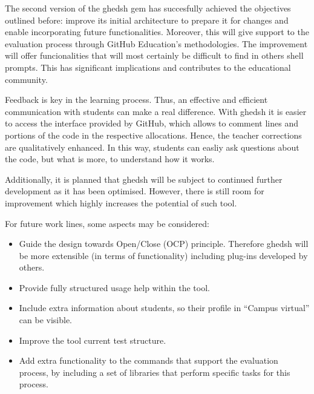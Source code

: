 
The second version of the ghedsh gem has succesfully achieved the objectives outlined
before: improve its initial architecture to prepare it for changes and enable
incorporating future functionalities. Moreover, this will give support to the evaluation
process through GitHub Education’s methodologies. The improvement will offer
funcionalities that will most certainly be difficult to find in others shell prompts.
This has significant implications and contributes to the educational community.
\bigskip

Feedback is key in the learning process. Thus, an effective and efficient communication
with students can make a real difference. With ghedsh it is easier to access the interface
provided by GitHub, which allows to comment lines and portions of the code in the
respective allocations. Hence, the teacher corrections are qualitatively enhanced. In
this way, students can easliy ask questions about the code, but what is more, to
understand how it works.
\bigskip

Additionally, it is planned that ghedsh will be subject to continued further
development as it has been optimised. However, there is still room for improvement
which highly increases the potential of such tool.
\bigskip

For future work lines, some aspects may be considered:
\begin{itemize}
  \item Guide the design towards Open/Close (OCP) principle. Therefore ghedsh will
  be more extensible (in terms of functionality) including plug-ins developed by
  others.
  \item Provide fully structured usage help within the tool.
  \item Include extra information about students, so their profile in “Campus virtual”
  can be visible.
  \item Improve the tool current test structure.
  \item Add extra functionality to the commands that support the evaluation process, by including a set of libraries
  that perform specific tasks for this process.
\end{itemize}


